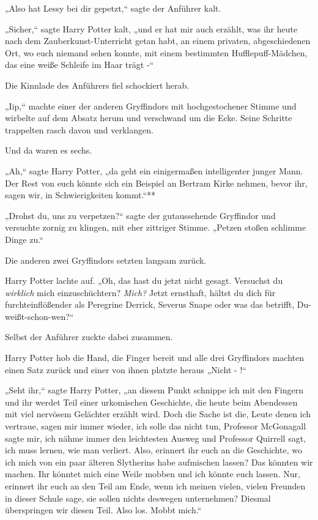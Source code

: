 {„Also hat Lessy bei dir gepetzt,“ sagte der Anführer kalt.

„Sicher,“ sagte Harry Potter kalt, „und er hat mir auch erzählt, was ihr heute nach dem Zauberkunst-Unterricht getan habt, an einem privaten, abgeschiedenen Ort, wo euch niemand sehen konnte, mit einem bestimmten Hufflepuff-Mädchen, das eine weiße Schleife im Haar trägt -“

Die Kinnlade des Anführers fiel schockiert herab.

„Iip,“ machte einer der anderen Gryffindors mit hochgestochener Stimme und wirbelte auf dem Absatz herum und verschwand um die Ecke. Seine Schritte trappelten rasch davon und verklangen.

Und da waren es sechs.

„Ah,“ sagte Harry Potter, „da geht ein einigermaßen intelligenter junger Mann. Der Rest von euch könnte sich ein Beispiel an Bertram Kirke nehmen, bevor ihr, sagen wir, in Schwierigkeiten kommt.“**

„Drohst du, uns zu verpetzen?“ sagte der gutaussehende Gryffindor und versuchte zornig zu klingen, mit eher zittriger Stimme. „Petzen stoßen schlimme Dinge zu.“

Die anderen zwei Gryffindors setzten langsam zurück.

Harry Potter lachte auf. „Oh, das hast du jetzt nicht gesagt. Versuchst du \emph{wirklich} mich einzuschüchtern? \emph{Mich?} Jetzt ernsthaft, hältst du dich für furchteinflößender als Peregrine Derrick, Severus Snape oder was das betrifft, Du-weißt-schon-wen?“

Selbst der Anführer zuckte dabei zusammen.

Harry Potter hob die Hand, die Finger bereit und alle drei Gryffindors machten einen Satz zurück und einer von ihnen platzte heraus „Nicht - !“

„Seht ihr,“ sagte Harry Potter, „an diesem Punkt schnippe ich mit den Fingern und ihr werdet Teil einer urkomischen Geschichte, die heute beim Abendessen mit viel nervösem Gelächter erzählt wird. Doch die Sache ist die, Leute denen ich vertraue, sagen mir immer wieder, ich solle das nicht tun, Professor McGonagall sagte mir, ich nähme immer den leichtesten Ausweg und Professor Quirrell sagt, ich muss lernen, wie man verliert. Also, erinnert ihr euch an die Geschichte, wo ich mich von ein paar älteren Slytherins habe aufmischen lassen? Das könnten wir machen. Ihr könntet mich eine Weile mobben und ich könnte euch lassen. Nur, erinnert ihr euch an den Teil am Ende, wenn ich meinen vielen, vielen Freunden in dieser Schule sage, sie sollen nichts deswegen unternehmen? Diesmal überspringen wir diesen Teil. Also los. Mobbt mich.“

}
